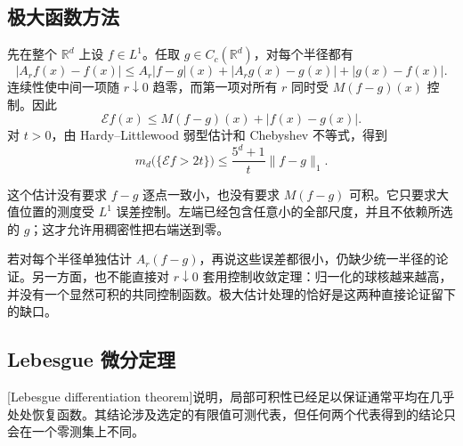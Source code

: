\subsection{极大函数方法}
\label{b1:subsec:140202}

先在整个 \(\mathbb R^d\) 上设 \(f\in L^1\)。任取 \(g\in C_c(\mathbb R^d)\)，对每个半径都有
\[
 |A_rf(x)-f(x)|
 \leq A_r|f-g|(x)+|A_rg(x)-g(x)|+|g(x)-f(x)|.
\]
连续性使中间一项随 \(r\downarrow0\) 趋零，而第一项对所有 \(r\) 同时受 \(M(f-g)(x)\) 控制。因此
\begin{equation}\label{b1:eq:differentiation-maximal-error}
 \mathcal E f(x)\leq M(f-g)(x)+|f(x)-g(x)|.
\end{equation}
对 \(t>0\)，由 Hardy--Littlewood 弱型估计和 Chebyshev 不等式，得到
\begin{equation}\label{b1:eq:differentiation-exceptional-estimate}
 m_d\bigl(\{\mathcal E f>2t\}\bigr)
 \leq\frac{5^d+1}{t}\|f-g\|_1.
\end{equation}

这个估计没有要求 \(f-g\) 逐点一致小，也没有要求 \(M(f-g)\) 可积。它只要求大值位置的测度受 \(L^1\) 误差控制。左端已经包含任意小的全部尺度，并且不依赖所选的 \(g\)；这才允许用稠密性把右端送到零。

\ProseParagraphBreak

若对每个半径单独估计 \(A_r(f-g)\)，再说这些误差都很小，仍缺少统一半径的论证。另一方面，也不能直接对 \(r\downarrow0\) 套用控制收敛定理：归一化的球核越来越高，并没有一个显然可积的共同控制函数。极大估计处理的恰好是这两种直接论证留下的缺口。

\subsection{Lebesgue 微分定理}
\label{b1:subsec:140203}

[Lebesgue differentiation theorem]说明，局部可积性已经足以保证通常平均在几乎处处恢复函数。其结论涉及选定的有限值可测代表，但任何两个代表得到的结论只会在一个零测集上不同。

